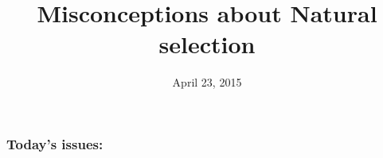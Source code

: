 





\title[Selection Misconceptions]{Misconceptions about Natural selection}
\date{April 23, 2015}



\begin{noheadline}
\maketitle
\end{noheadline}


\begin{noheadline}
\begin{frame}
\frametitle{Today's issues:}
\vspace{5mm}
\tableofcontents[subsectionstyle=hide]
\end{frame}
\end{noheadline}

